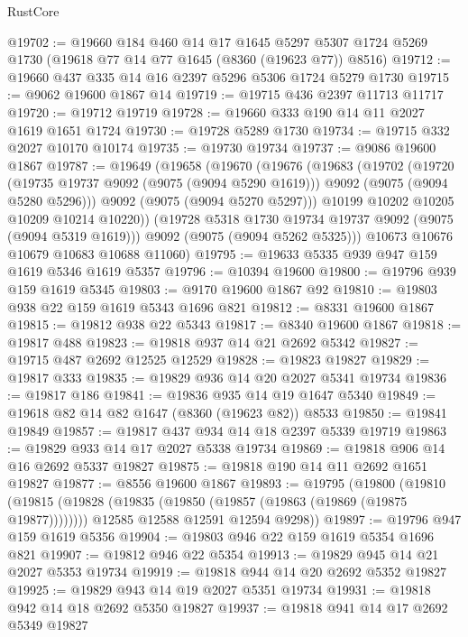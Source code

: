 \begin{lexlean}{RustCore}
\begin{coremodule}
@19702 := @19660
    @184
    @460
    @14
    @17
    @1645
    @5297
    @5307
    @1724
    @5269
    @1730
    (@19618 @77 @14 @77 @1645 (@8360 (@19623 @77)) @8516)
@19712 := @19660 @437 @335 @14 @16 @2397 @5296 @5306 @1724 @5279 @1730
@19715 := @9062 @19600 @1867 @14
@19719 := @19715 @436 @2397 @11713 @11717
@19720 := @19712 @19719
@19728 := @19660 @333 @190 @14 @11 @2027 @1619 @1651 @1724
@19730 := @19728 @5289 @1730
@19734 := @19715 @332 @2027 @10170 @10174
@19735 := @19730 @19734
@19737 := @9086 @19600 @1867
@19787 := @19649
    (@19658
      (@19670
        (@19676
          (@19683
            (@19702
              (@19720
                (@19735 @19737 @9092 (@9075 (@9094 @5290 @1619)))
                @9092
                (@9075 (@9094 @5280 @5296)))
              @9092
              (@9075 (@9094 @5270 @5297)))
            @10199
            @10202
            @10205
            @10209
            @10214
            @10220))
        (@19728 @5318 @1730 @19734 @19737 @9092 (@9075 (@9094 @5319 @1619)))
        @9092
        (@9075 (@9094 @5262 @5325)))
      @10673
      @10676
      @10679
      @10683
      @10688
      @11060)
@19795 := @19633 @5335 @939 @947 @159 @1619 @5346 @1619 @5357
@19796 := @10394 @19600
@19800 := @19796 @939 @159 @1619 @5345
@19803 := @9170 @19600 @1867 @92
@19810 := @19803 @938 @22 @159 @1619 @5343 @1696 @821
@19812 := @8331 @19600 @1867
@19815 := @19812 @938 @22 @5343
@19817 := @8340 @19600 @1867
@19818 := @19817 @488
@19823 := @19818 @937 @14 @21 @2692 @5342
@19827 := @19715 @487 @2692 @12525 @12529
@19828 := @19823 @19827
@19829 := @19817 @333
@19835 := @19829 @936 @14 @20 @2027 @5341 @19734
@19836 := @19817 @186
@19841 := @19836 @935 @14 @19 @1647 @5340
@19849 := @19618 @82 @14 @82 @1647 (@8360 (@19623 @82)) @8533
@19850 := @19841 @19849
@19857 := @19817 @437 @934 @14 @18 @2397 @5339 @19719
@19863 := @19829 @933 @14 @17 @2027 @5338 @19734
@19869 := @19818 @906 @14 @16 @2692 @5337 @19827
@19875 := @19818 @190 @14 @11 @2692 @1651 @19827
@19877 := @8556 @19600 @1867
@19893 := @19795
    (@19800
      (@19810
        (@19815 (@19828 (@19835 (@19850 (@19857 (@19863 (@19869 (@19875 @19877))))))))
        @12585
        @12588
        @12591
        @12594
        @9298))
@19897 := @19796 @947 @159 @1619 @5356
@19904 := @19803 @946 @22 @159 @1619 @5354 @1696 @821
@19907 := @19812 @946 @22 @5354
@19913 := @19829 @945 @14 @21 @2027 @5353 @19734
@19919 := @19818 @944 @14 @20 @2692 @5352 @19827
@19925 := @19829 @943 @14 @19 @2027 @5351 @19734
@19931 := @19818 @942 @14 @18 @2692 @5350 @19827
@19937 := @19818 @941 @14 @17 @2692 @5349 @19827

\end{coremodule}
\end{lexlean}
